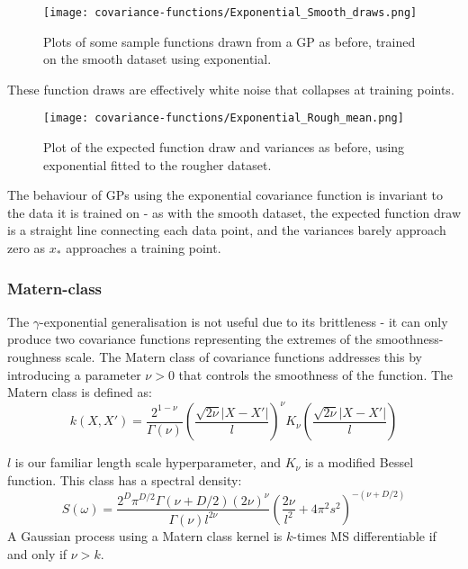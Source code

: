 \begin{figure}[H]
    \texttt{[image: covariance-functions/Exponential\_Smooth\_draws.png]}
    \caption{
        Plots of some sample functions drawn from a GP as before, trained on the smooth dataset using exponential. \\
    }
\end{figure}
These function draws are effectively white noise that collapses at training points.

\begin{figure}[H]
    \texttt{[image: covariance-functions/Exponential\_Rough\_mean.png]}
    \caption{
        Plot of the expected function draw and variances as before, using exponential fitted to the rougher dataset.
    }
\end{figure}
The behaviour of GPs using the exponential covariance function is invariant to the data it is trained on - as with the smooth dataset, the expected function draw is a straight line connecting each data point, and the variances barely approach zero as $x_*$ approaches a training point. 


\subsubsection{Matern-class}
The $\gamma$-exponential generalisation is not useful due to its brittleness - it can only produce two covariance functions representing the extremes of the smoothness-roughness scale. The Matern class of covariance functions addresses this by introducing a parameter $\nu > 0$ that controls the smoothness of the function. The Matern class is defined as:
\begin{equation*}
    k(X,X') = \frac{2^{1 - \nu}}{\Gamma(\nu)}\left(\frac{\sqrt{2\nu}|X - X'|}{l}\right)^{\nu}K_{\nu}\left(\frac{\sqrt{2\nu}|X - X'|}{l}\right)
\end{equation*}

$l$ is our familiar length scale hyperparameter, and $K_{\nu}$ is a modified Bessel function. This class has a spectral density:
\begin{equation*}
    S(\omega) = \frac{2^D \pi^{D/2} \Gamma(\nu + D/2) (2\nu)^\nu}{\Gamma(\nu) l^{2\nu}} \left( \frac{2\nu}{l^2} + 4 \pi^2 s^2 \right)^{-(\nu + D/2)} 
\end{equation*}
A Gaussian process using a Matern class kernel is $k$-times MS differentiable if and only if $\nu > k$. 

